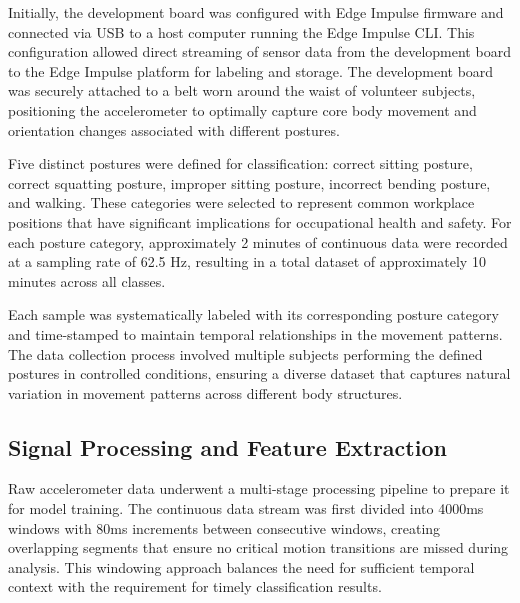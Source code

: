\documentclass[
  9pt,
  letterpaper,
  abstract,
  titlepage]{scrbook}
\begin{document}
Initially, the development board was configured with Edge Impulse
firmware and connected via USB to a host computer running the Edge
Impulse CLI. This configuration allowed direct streaming of sensor data
from the development board to the Edge Impulse platform for labeling and
storage. The development board was securely attached to a belt worn
around the waist of volunteer subjects, positioning the accelerometer to
optimally capture core body movement and orientation changes associated
with different postures.

Five distinct postures were defined for classification: correct sitting
posture, correct squatting posture, improper sitting posture, incorrect
bending posture, and walking. These categories were selected to
represent common workplace positions that have significant implications
for occupational health and safety. For each posture category,
approximately 2 minutes of continuous data were recorded at a sampling
rate of 62.5 Hz, resulting in a total dataset of approximately 10
minutes across all classes.

Each sample was systematically labeled with its corresponding posture
category and time-stamped to maintain temporal relationships in the
movement patterns. The data collection process involved multiple
subjects performing the defined postures in controlled conditions,
ensuring a diverse dataset that captures natural variation in movement
patterns across different body structures.

\subsection{Signal Processing and Feature
Extraction}\label{signal-processing-and-feature-extraction}

Raw accelerometer data underwent a multi-stage processing pipeline to
prepare it for model training. The continuous data stream was first
divided into 4000ms windows with 80ms increments between consecutive
windows, creating overlapping segments that ensure no critical motion
transitions are missed during analysis. This windowing approach balances
the need for sufficient temporal context with the requirement for timely
classification results.
\end{document}
